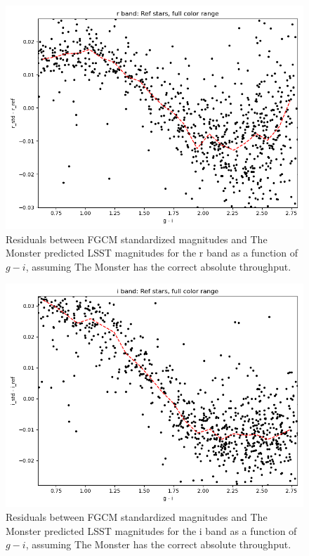 \begin{figure}
  \includegraphics{photometric_calibration_figures/reference_residuals_r.png}
  \caption{Residuals between FGCM standardized magnitudes and The Monster
    predicted LSST magnitudes for the r band as a function of $g-i$, assuming
    The Monster has the correct absolute throughput.}
\end{figure}

\begin{figure}
  \includegraphics{photometric_calibration_figures/reference_residuals_i.png}
  \caption{Residuals between FGCM standardized magnitudes and The Monster
    predicted LSST magnitudes for the i band as a function of $g-i$, assuming
    The Monster has the correct absolute throughput.}
\end{figure}

